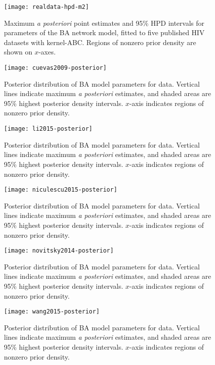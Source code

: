 \documentclass[12pt]{article}\usepackage[]{graphicx}\usepackage[]{color}
\begin{document}
\begin{figure}[ht]
  \texttt{[image: realdata-hpd-m2]}
  \vspace{8pt}
  \caption{
      Maximum \textit{a posteriori} point estimates and 95\% HPD intervals for
      parameters of the BA network model, fitted to five published HIV datasets
      with kernel-ABC. Regions of nonzero prior density are shown on $x$-axes.
  }
  \label{fig:abchpdm2}
\end{figure}

\begin{figure}[ht]
  \texttt{[image: cuevas2009-posterior]}
  \caption{
      Posterior distribution of BA model parameters for
      \textcite{cuevas2009hiv} data. Vertical lines indicate maximum \textit{a
      posteriori} estimates, and shaded areas are 95\% highest posterior
      density intervals. $x$-axis indicates regions of nonzero prior density.
  }
  \label{fig:cuevas}
\end{figure}

\begin{figure}[ht]
  \texttt{[image: li2015-posterior]}
  \caption{
      Posterior distribution of BA model parameters for \textcite{li2015hiv}
      data. Vertical lines indicate maximum \textit{a posteriori} estimates,
      and shaded areas are 95\% highest posterior density intervals. $x$-axis
      indicates regions of nonzero prior density.
  }
  \label{fig:li}
\end{figure}

\begin{figure}[ht]
  \texttt{[image: niculescu2015-posterior]}
  \caption{
      Posterior distribution of BA model parameters for
      \textcite{niculescu2015recent} data. Vertical lines indicate maximum
      \textit{a posteriori} estimates, and shaded areas are 95\% highest
      posterior density intervals. $x$-axis indicates regions of nonzero prior
      density.
  }
  \label{fig:niculescu}
\end{figure}

\begin{figure}[ht]
  \texttt{[image: novitsky2014-posterior]}
  \caption{
      Posterior distribution of BA model parameters for
      \textcite{novitsky2013phylogenetic, novitsky2014impact} data. Vertical
      lines indicate maximum \textit{a posteriori} estimates, and shaded areas
      are 95\% highest posterior density intervals. $x$-axis indicates regions
      of nonzero prior density.
  }
  \label{fig:novitsky}
\end{figure}

\begin{figure}[ht]
  \texttt{[image: wang2015-posterior]}
  \caption{
      Posterior distribution of BA model parameters for
      \textcite{wang2015targeting} data. Vertical lines indicate maximum
      \textit{a posteriori} estimates, and shaded areas are 95\% highest
      posterior density intervals. $x$-axis indicates regions of nonzero prior
      density.
  }
  \label{fig:wang}
\end{figure}
\end{document}
